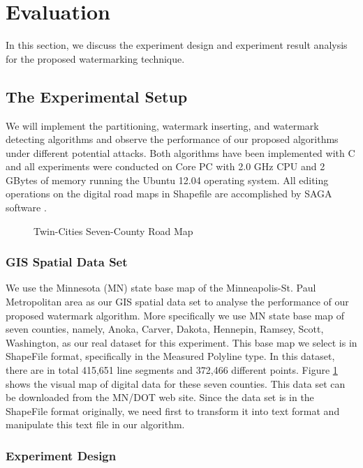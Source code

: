 \section{Evaluation}
\label{sec:exper}


In this section, we discuss the experiment design and experiment
 result analysis for the proposed watermarking technique.

\subsection{The Experimental Setup}
We will implement the partitioning, watermark inserting,
and watermark detecting algorithms and observe the performance 
of our proposed algorithms under different potential attacks.
Both algorithms have been implemented with C and all
experiments were conducted on Core PC with 2.0 GHz
CPU and 2 GBytes of memory running the Ubuntu 12.04 operating system.
All editing operations on the digital road maps in Shapefile are
accomplished by SAGA software \cite{sagaurl}. 

\begin{figure}[ht]
\centering
{}
\caption{Twin-Cities Seven-County Road Map}
\label{fig:region}
\end{figure}


\subsubsection{GIS Spatial Data Set}

We use the Minnesota (MN) state base map of the Minneapolis-St. Paul 
Metropolitan area as our GIS spatial data set to analyse the performance 
of our proposed watermark algorithm. More specifically we use MN state base 
map of seven counties, namely, Anoka, Carver, Dakota, Hennepin, Ramsey, Scott, 
Washington, as our real dataset for this experiment. 
This base map we select is in ShapeFile format\cite{shapefileurl}, 
specifically in the Measured Polyline 
type. In this dataset, there are in total 415,651 line segments
and 372,466 different points. Figure \ref{fig:region} shows the visual map
of digital data for these seven counties. This data set can
be downloaded from the MN/DOT web site\cite{mndoturl}. Since the data
set is in the ShapeFile format originally, we need first to
transform it into text format and manipulate this text file in our algorithm.


\subsubsection{Experiment Design}


